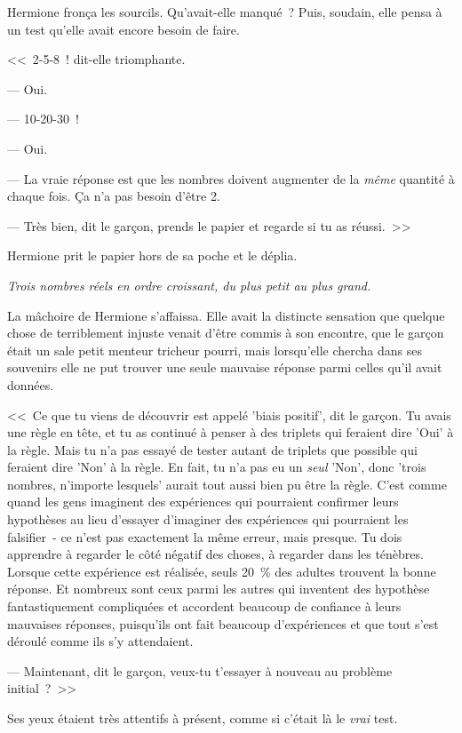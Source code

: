 Hermione fronça les sourcils. Qu'avait-elle manqué~? Puis, soudain, elle pensa à un test qu'elle avait encore besoin de faire.

<<~2-5-8~! dit-elle triomphante.

--- Oui.

--- 10-20-30~!

--- Oui.

--- La vraie réponse est que les nombres doivent augmenter de la \emph{même} quantité à chaque fois. Ça n'a pas besoin d'être 2.

--- Très bien, dit le garçon, prends le papier et regarde si tu as réussi.~>>

Hermione prit le papier hors de sa poche et le déplia.

\emph{Trois nombres réels en ordre croissant, du plus petit au plus grand.}

La mâchoire de Hermione s'affaissa. Elle avait la distincte sensation que quelque chose de terriblement injuste venait d'être commis à son encontre, que le garçon était un sale petit menteur tricheur pourri, mais lorsqu'elle chercha dans ses souvenirs elle ne put trouver une seule mauvaise réponse parmi celles qu'il avait données.

<<~Ce que tu viens de découvrir est appelé 'biais positif', dit le garçon. Tu avais une règle en tête, et tu as continué à penser à des triplets qui feraient dire 'Oui' à la règle. Mais tu n'a pas essayé de tester autant de triplets que possible qui feraient dire 'Non' à la règle. En fait, tu n'a pas eu un \emph{seul} 'Non', donc 'trois nombres, n'importe lesquels' aurait tout aussi bien pu être la règle. C'est comme quand les gens imaginent des expériences qui pourraient confirmer leurs hypothèses au lieu d'essayer d'imaginer des expériences qui pourraient les falsifier~- ce n'est pas exactement la même erreur, mais presque. Tu dois apprendre à regarder le côté négatif des choses, à regarder dans les ténèbres. Lorsque cette expérience est réalisée, seuls 20~\% des adultes trouvent la bonne réponse. Et nombreux sont ceux parmi les autres qui inventent des hypothèse fantastiquement compliquées et accordent beaucoup de confiance à leurs mauvaises réponses, puisqu'ils ont fait beaucoup d'expériences et que tout s'est déroulé comme ils s'y attendaient.

--- Maintenant, dit le garçon, veux-tu t'essayer à nouveau au problème initial~?~>>

Ses yeux étaient très attentifs à présent, comme si c'était là le \emph{vrai} test.

